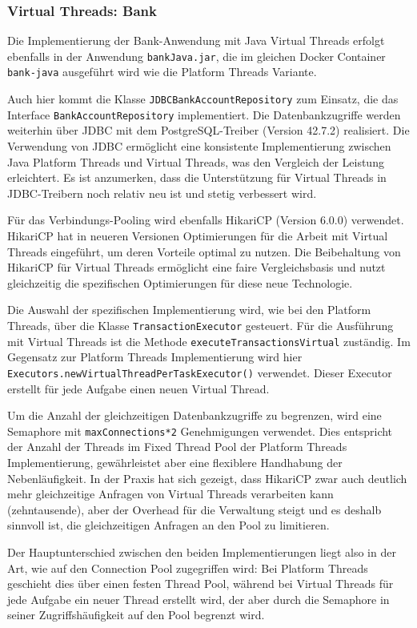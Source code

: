 \documentclass[fontsize=12pt,paper=a4,twoside=semi,parskip=half-,headsepline,headinclude]{scrreprt}
\begin{document}
\subsubsection{Virtual Threads: Bank}

Die Implementierung der Bank-Anwendung mit Java Virtual Threads erfolgt ebenfalls in der Anwendung \texttt{bankJava.jar}, die im gleichen Docker Container \texttt{bank-java} ausgeführt wird wie die Platform Threads Variante.

Auch hier kommt die Klasse \texttt{JDBCBankAccountRepository} zum Einsatz, die das Interface \texttt{BankAccountRepository} implementiert. Die Datenbankzugriffe werden weiterhin über JDBC mit dem PostgreSQL-Treiber (Version 42.7.2) realisiert. Die Verwendung von JDBC ermöglicht eine konsistente Implementierung zwischen Java Platform Threads und Virtual Threads, was den Vergleich der Leistung erleichtert. Es ist anzumerken, dass die Unterstützung für Virtual Threads in JDBC-Treibern noch relativ neu ist und stetig verbessert wird.

Für das Verbindungs-Pooling wird ebenfalls HikariCP (Version 6.0.0) verwendet. HikariCP hat in neueren Versionen Optimierungen für die Arbeit mit Virtual Threads eingeführt, um deren Vorteile optimal zu nutzen. Die Beibehaltung von HikariCP für Virtual Threads ermöglicht eine faire Vergleichsbasis und nutzt gleichzeitig die spezifischen Optimierungen für diese neue Technologie.

Die Auswahl der spezifischen Implementierung wird, wie bei den Platform Threads, über die Klasse \texttt{TransactionExecutor} gesteuert. Für die Ausführung mit Virtual Threads ist die Methode \texttt{executeTransactionsVirtual} zuständig.
Im Gegensatz zur Platform Threads Implementierung wird hier \texttt{Executors.newVirtualThreadPerTaskExecutor()} verwendet. Dieser Executor erstellt für jede Aufgabe einen neuen Virtual Thread.

Um die Anzahl der gleichzeitigen Datenbankzugriffe zu begrenzen, wird eine Semaphore mit \texttt{maxConnections*2} Genehmigungen verwendet. Dies entspricht der Anzahl der Threads im Fixed Thread Pool der Platform Threads Implementierung, gewährleistet aber eine flexiblere Handhabung der Nebenläufigkeit. In der Praxis hat sich gezeigt, dass HikariCP zwar auch deutlich mehr gleichzeitige Anfragen von Virtual Threads verarbeiten kann (zehntausende), aber der Overhead für die Verwaltung steigt und es deshalb sinnvoll ist, die gleichzeitigen Anfragen an den Pool zu limitieren.

Der Hauptunterschied zwischen den beiden Implementierungen liegt also in der Art, wie auf den Connection Pool zugegriffen wird: Bei Platform Threads geschieht dies über einen festen Thread Pool, während bei Virtual Threads für jede Aufgabe ein neuer Thread erstellt wird, der aber durch die Semaphore in seiner Zugriffshäufigkeit auf den Pool begrenzt wird.
\end{document}
